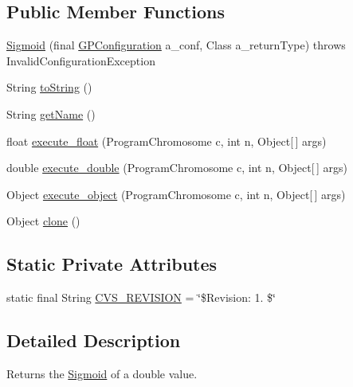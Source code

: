 \subsection*{Public Member Functions}
\begin{DoxyCompactItemize}
\item 
\hyperlink{classexamples_1_1gp_1_1symbolic_regression_1_1_sigmoid_aaebda63b279fa043e2f98b2c318a9989}{Sigmoid} (final \hyperlink{classorg_1_1jgap_1_1gp_1_1impl_1_1_g_p_configuration}{G\-P\-Configuration} a\-\_\-conf, Class a\-\_\-return\-Type)  throws Invalid\-Configuration\-Exception 
\item 
String \hyperlink{classexamples_1_1gp_1_1symbolic_regression_1_1_sigmoid_a7b2e7d1f0cba3e9e3afb544c24156474}{to\-String} ()
\item 
String \hyperlink{classexamples_1_1gp_1_1symbolic_regression_1_1_sigmoid_a6d23ccbdb487c8f7e3a8d0443c346352}{get\-Name} ()
\item 
float \hyperlink{classexamples_1_1gp_1_1symbolic_regression_1_1_sigmoid_a0f2a2fbd1e3f3ccb7376d91e343620ce}{execute\-\_\-float} (Program\-Chromosome c, int n, Object\mbox{[}$\,$\mbox{]} args)
\item 
double \hyperlink{classexamples_1_1gp_1_1symbolic_regression_1_1_sigmoid_a073543c5af217d1934aebd060fba712d}{execute\-\_\-double} (Program\-Chromosome c, int n, Object\mbox{[}$\,$\mbox{]} args)
\item 
Object \hyperlink{classexamples_1_1gp_1_1symbolic_regression_1_1_sigmoid_a2642230cf325d1025266b3aa9d42ed0f}{execute\-\_\-object} (Program\-Chromosome c, int n, Object\mbox{[}$\,$\mbox{]} args)
\item 
Object \hyperlink{classexamples_1_1gp_1_1symbolic_regression_1_1_sigmoid_a6a35ee90e09e868d82ee62386f34ec4f}{clone} ()
\end{DoxyCompactItemize}
\subsection*{Static Private Attributes}
\begin{DoxyCompactItemize}
\item 
static final String \hyperlink{classexamples_1_1gp_1_1symbolic_regression_1_1_sigmoid_ac6597457c3deea5310e5a3fb7a8520d7}{C\-V\-S\-\_\-\-R\-E\-V\-I\-S\-I\-O\-N} = \char`\"{}\$Revision\-: 1. \$\char`\"{}
\end{DoxyCompactItemize}


\subsection{Detailed Description}
Returns the \hyperlink{classexamples_1_1gp_1_1symbolic_regression_1_1_sigmoid}{Sigmoid} of a double value.

